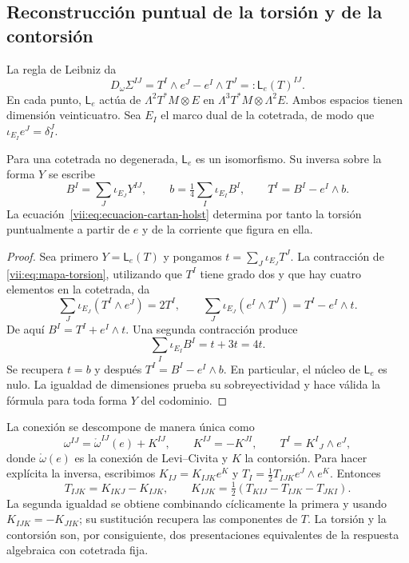 \subsection{Reconstrucción puntual de la torsión y de la contorsión}
\label{vii:subsec:reconstruccion-torsion}

La regla de Leibniz da
\begin{equation}
 D_\omega\Sigma^{IJ}
 =T^I\wedge e^J-e^I\wedge T^J
 =:\mathsf L_e(T)^{IJ}.
 \label{vii:eq:mapa-torsion}
\end{equation}
En cada punto, \(\mathsf L_e\) actúa de
\(\Lambda^2T^*M\otimes E\) en
\(\Lambda^3T^*M\otimes\Lambda^2E\). Ambos espacios tienen dimensión
veinticuatro. Sea \(E_I\) el marco dual de la cotetrada, de modo que
\(\iota_{E_I}e^J=\delta_I^J\).

\begin{theorem}
\label{vii:thm:inversion-torsion}
Para una cotetrada no degenerada, \(\mathsf L_e\) es un isomorfismo.
Su inversa sobre la forma \(Y\) se escribe
\begin{equation}
 B^I=\sum_J\iota_{E_J}Y^{IJ},\qquad
 b=\tfrac14\sum_I\iota_{E_I}B^I,\qquad
 T^I=B^I-e^I\wedge b.
 \label{vii:eq:torsion-explicita}
\end{equation}
La ecuación~\eqref{vii:eq:ecuacion-cartan-holst} determina por tanto
la torsión puntualmente a partir de \(e\) y de la corriente que figura
en ella.
\end{theorem}
\begin{proof}
Sea primero \(Y=\mathsf L_e(T)\) y pongamos
\(t=\sum_J\iota_{E_J}T^J\). La contracción de
\eqref{vii:eq:mapa-torsion}, utilizando que \(T^I\) tiene grado dos
y que hay cuatro elementos en la cotetrada, da
\[
 \sum_J\iota_{E_J}(T^I\wedge e^J)=2T^I,
 \qquad
 \sum_J\iota_{E_J}(e^I\wedge T^J)=T^I-e^I\wedge t.
\]
De aquí \(B^I=T^I+e^I\wedge t\). Una segunda contracción produce
\[
 \sum_I\iota_{E_I}B^I=t+3t=4t.
\]
Se recupera \(t=b\) y después \(T^I=B^I-e^I\wedge b\).
En particular, el núcleo de \(\mathsf L_e\) es nulo. La igualdad
de dimensiones prueba su sobreyectividad y hace válida la fórmula
para toda forma \(Y\) del codominio.
\end{proof}

La conexión se descompone de manera única como
\begin{equation}
 \omega^{IJ}=\mathring\omega^{IJ}(e)+K^{IJ},\qquad
 K^{IJ}=-K^{JI},\qquad T^I=K^I{}_{J}\wedge e^J,
 \label{vii:eq:contorsion}
\end{equation}
donde \(\mathring\omega(e)\) es la conexión de Levi--Civita y
\(K\) la contorsión. Para hacer explícita la inversa, escribimos
\(K_{IJ}=K_{IJK}e^K\) y
\(T_I=\tfrac12T_{IJK}e^J\wedge e^K\). Entonces
\begin{equation}
 T_{IJK}=K_{IKJ}-K_{IJK},\qquad
 K_{IJK}=\tfrac12(T_{KIJ}-T_{IJK}-T_{JKI}).
 \label{vii:eq:contorsion-componentes}
\end{equation}
La segunda igualdad se obtiene combinando cíclicamente la primera y
usando \(K_{IJK}=-K_{JIK}\); su sustitución recupera las componentes
de \(T\). La torsión y la contorsión son, por consiguiente, dos
presentaciones equivalentes de la respuesta algebraica con cotetrada fija.

